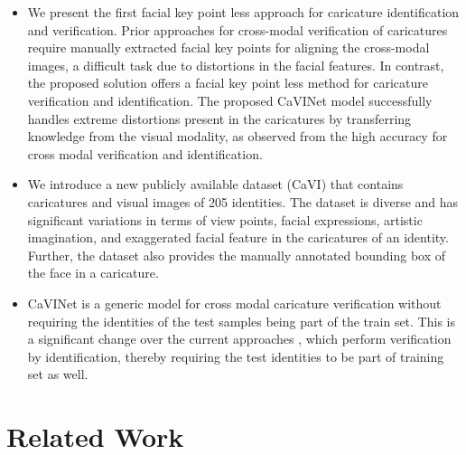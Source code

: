 \begin{itemize}
\item We present the first facial key point less approach for caricature identification and verification. Prior approaches for cross-modal verification of caricatures \cite{rw1, rw5} require manually extracted facial key points for aligning the cross-modal images, a difficult task due to distortions in the facial features. %
In contrast, the proposed solution offers a facial key point less method for caricature verification and identification. %
The proposed CaVINet model successfully handles extreme distortions present in the caricatures by transferring knowledge from the visual modality, as observed from the high accuracy for cross modal verification and identification.
\item We introduce a new publicly available dataset (CaVI) that contains caricatures and visual images of 205 identities. The dataset is diverse and has significant variations in terms of view points, facial expressions, artistic imagination, and exaggerated facial feature in the caricatures of an identity. Further, the dataset also provides the manually annotated bounding box of the face in a caricature. %
\item CaVINet is a generic model for cross modal caricature verification without requiring the identities of the test samples being part of the train set. This is a significant change over the current approaches \cite{rw1, rw5}, which perform verification by identification, thereby requiring the test identities to be part of training set as well. %
\end{itemize}

\section{Related Work}

